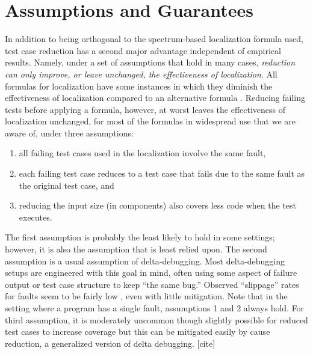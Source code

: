 \section{Assumptions and Guarantees}
\label{formal}

In addition to being orthogonal to the spectrum-based localization
formula used, test case reduction has a second major advantage
independent of empirical results.  Namely, under a set of assumptions
that hold in many cases, \emph{reduction can only improve, or leave
unchanged, the effectiveness of localization}.  All formulas for
localization have some instances in which they diminish the
effectiveness of localization compared to an alternative formula
\cite{yoo2014no}. 
Reducing failing tests before applying a formula, however, at worst
leaves the effectiveness of localization unchanged, for most of the
formulas in widespread use that we are aware of, under three
assumptions:

\begin{enumerate}
\item all failing test cases used in the localization involve the same
fault,
\item each failing test case reduces to a test case that fails due to the same fault as the original test case, and
\item reducing the input size (in components) also covers less code when the test executes.
\end{enumerate}

The first assumption is probably the least likely to hold in some
settings; however, it is also the assumption that is least relied
upon. The second assumption is a usual assumption of delta-debugging.  Most
delta-debugging setups are engineered with this goal in mind, often
using some aspect of failure output or test case structure to keep
``the same bug.''  Observed ``slippage'' rates for faults
seem to be fairly low \cite{PLDI13}, even with little mitigation.
Note that in the setting where a program has a single fault,
assumptions 1 and 2 always hold.  For third assumption, it is moderately uncommon though slightly possible for reduced test cases to increase coverage but this can be mitigated easily by cause reduction, a generalized version of delta debugging. [cite] 


